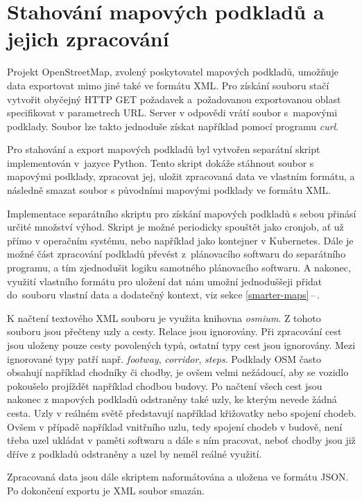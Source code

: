 \documentclass[czech, bachelor]{diploma}
\newcommand{\filipref}[1]{\ref{#1}\,--\,\nameref{#1}}
\begin{document}
\section{Stahování mapových podkladů a jejich zpracování}

Projekt OpenStreetMap, zvolený poskytovatel mapových podkladů, umožňuje data exportovat mimo jiné také ve formátu XML. Pro získání
souboru stačí vytvořit obyčejný HTTP GET požadavek a~požadovanou exportovanou oblast specifikovat v parametrech URL. Server
v odpovědi vrátí soubor s~mapovými podklady. Soubor lze takto jednoduše získat například pomocí programu \emph{curl}.

Pro stahování a export mapových podkladů byl vytvořen separátní skript implementován v~jazyce Python. Tento skript dokáže stáhnout
soubor s mapovými podklady, zpracovat jej, uložit zpracovaná data ve vlastním formátu, a následně smazat soubor s původními
mapovými podklady ve formátu XML.

Implementace separátního skriptu pro získání mapových podkladů s sebou přinásí určité množství výhod. Skript je možné periodicky
spouštět jako cronjob, ať už přímo v operačním systému, nebo například jako kontejner v Kubernetes. Dále je možné část zpracování
podkladů převést z~plánovacího softwaru do separátního programu, a tím zjednodušit logiku samotného plánovacího softwaru.
A nakonec, využití vlastního formátu pro uložení dat nám umožní jednoduššeji přidat do~souboru vlastní data a dodatečný kontext,
viz sekce \filipref{smarter-maps}.

K načtení textového XML souboru je využita knihovna \emph{osmium}. Z tohoto souboru jsou přečteny uzly a cesty. Relace jsou
ignorovány. Při zpracování cest jsou uloženy pouze cesty povolených typů, ostatní typy cest jsou ignorovány. Mezi ignorované typy
patří např. \emph{footway}, \emph{corridor}, \emph{steps}. Podklady OSM často obsahují například chodníky či chodby, je ovšem
velmi nežádoucí, aby se vozidlo pokoušelo projíždět například chodbou budovy. Po načtení všech cest jsou nakonec z mapových
podkladů odstraněny také uzly, ke kterým nevede žádná cesta. Uzly v reálném světě představují například křižovatky nebo spojení
chodeb. Ovšem v případě například vnitřního uzlu, tedy spojení chodeb v budově, není třeba uzel ukládat v paměti softwaru a dále
s ním pracovat, neboť chodby jsou již dříve z podkladů odstraněny a uzel by neměl reálné využití.

Zpracovaná data jsou dále skriptem naformátována a uložena ve formátu JSON. Po dokončení exportu je XML soubor smazán.
\end{document}
